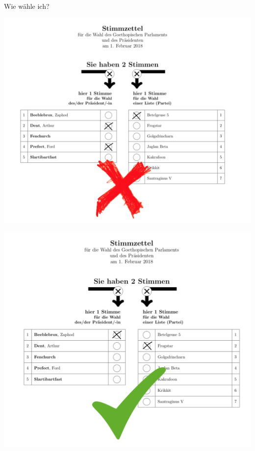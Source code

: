 \documentclass{sasbase}
\begin{document}
\begin{question}{Wie wähle ich?}
\begin{minipage}{0.5\linewidth}
    \end{minipage}
    \begin{minipage}{0.5\linewidth}
    \includegraphics[width=\textwidth]{falsch_3.png}
    \end{minipage}
    \begin{minipage}{0.5\linewidth}
    \includegraphics[width=\textwidth]{richtig.png}
    \end{minipage}



\end{question}
\end{document}
